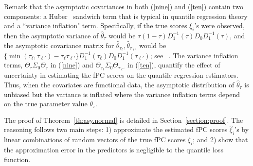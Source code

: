 \documentclass[times,sort&compress,3p]{elsarticle}
\theoremstyle{plain}%
\newtheorem{corollary}{Corollary}
\theoremstyle{definition}
\newcommand{\bD}{{D}}
\newcommand{\btheta}{{\theta}}
\newcommand{\bxi}{{\xi}}
\begin{document}
Remark that the asymptotic covariances in both (\ref{nine}) and (\ref{ten}) contain two components: a Huber~\citep{huber1967} sandwich term that is typical in quantile regression theory and a ``variance inflation" term. Specifically, if the true scores $\bxi_{i} $'s were observed, then the asymptotic variance of $\widehat{\btheta}_{\tau}$ would be $\tau(1-\tau)\bD_{1}^{-1}(\tau)\bD_{0}\bD_{1}^{-1}(\tau)$, 
and the asymptotic covariance matrix for $\widehat{\btheta}_{\tau_{\ell}}, \widehat{\btheta}_{\tau_{\ell'}}$ would be $\{\min(\tau_{\ell},\tau_{\ell'})-\tau_{\ell}\tau_{\ell'} \} \bD_{1}^{-1}(\tau_{\ell})\bD_{0}\bD_{1}^{-1}(\tau_{\ell'})$; see ~\cite{pollard1991,koenker2005}. The variance inflation terms, ${\Theta}_{\tau} {\Sigma}_0 {\Theta}_{\tau}$ in (\ref{nine}) and ${\Theta}_{\tau_{\ell}} {\Sigma}_0 {\Theta}_{\tau_{\ell'}}$ in  (\ref{ten}), quantify the effect of uncertainty in estimating the fPC scores on the quantile regression estimators. Thus, when the covariates are functional data, the asymptotic distribution of $\widehat{\btheta}_{\tau}$ is unbiased but the variance is inflated where the variance inflation terms depend on the true parameter value $\btheta_{\tau}$.

The proof of Theorem~\ref{th:asy.normal} is detailed in Section~\ref{section:proof}. %
The reasoning follows two main steps: 1) approximate the estimated fPC scores $\widehat{\bxi}_i$'s by linear combinations of random vectors of the true fPC scores ${\bxi}_i$; and 2) show that the approximation error in the predictors is negligible to the quantile loss function. {}

\end{document}
